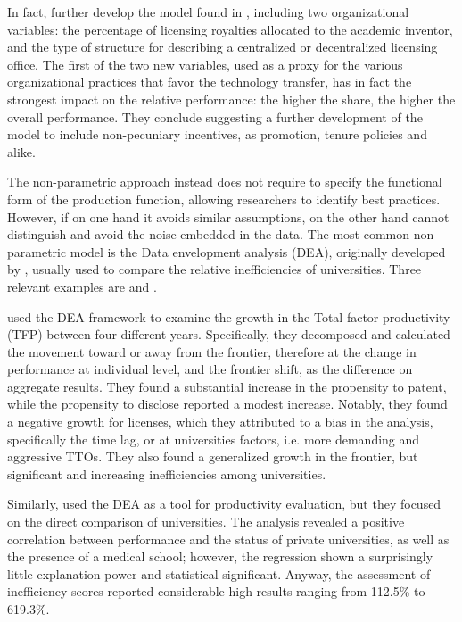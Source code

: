 In fact, \citet{Link2005} further develop the model found in \citet{Siegel2003a}, including two organizational variables: the percentage of licensing royalties allocated to the academic inventor, and the type of structure for describing a centralized or decentralized licensing office. The first of the two new variables, used as a proxy for the various organizational practices that favor the technology transfer, has in fact the strongest impact on the relative performance: the higher the share, the higher the overall performance. They conclude suggesting a further development of the model to include non-pecuniary incentives, as promotion, tenure policies and alike. 

The non-parametric approach instead does not require to specify the functional form of the production function, allowing researchers to identify best practices. However, if on one hand it avoids similar assumptions, on the other hand cannot distinguish and avoid the noise embedded in the data. The most common non-parametric model is the Data envelopment analysis (DEA), originally developed by \citet{Fare1993}, usually used to compare the relative inefficiencies of universities. Three relevant examples are \citet{Thursby2002} and \citet{Anderson2007}.

\citet{Thursby2002} used the DEA framework to examine the growth in the Total factor productivity (TFP) between four different years. Specifically, they decomposed and calculated the movement toward or away from the frontier, therefore at the change in performance at individual level, and the frontier shift, as the difference on aggregate results. They found a substantial increase in the propensity to patent, while the propensity to disclose reported a modest increase. Notably, they found a negative growth for licenses, which they attributed to a bias in the analysis, specifically the time lag, or at universities factors, i.e. more demanding and aggressive TTOs. They also found a generalized growth in the frontier, but significant and increasing inefficiencies among universities.

Similarly, \citet{Anderson2007} used the DEA as a tool for productivity evaluation, but they focused on the direct comparison of universities. The analysis revealed a positive correlation between performance and the status of private universities, as well as the presence of a medical school; however, the regression shown a surprisingly little explanation power and statistical significant. Anyway, the assessment of inefficiency scores reported considerable high results ranging from 112.5\% to 619.3\%.

